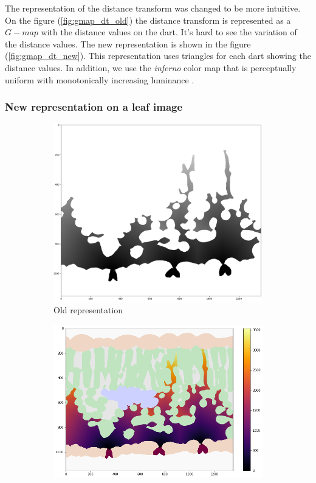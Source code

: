 The representation of the distance transform was changed to be more intuitive. On
the figure (\ref{fig:gmap_dt_old}) the distance transform is represented as a
$G-map$ with the distance values on the dart. It's hard to see the variation of the
distance values. The new representation is shown in the figure (\ref{fig:gmap_dt_new}).
This representation uses triangles for each dart showing the distance values. In
addition, we use the \textit{inferno} color map that is perceptually uniform with 
monotonically increasing luminance \cite{Moreland}.

\subsubsection{New representation on a leaf image}

\begin{figure}[h]
    \centering
    \begin{subfigure}{0.45\textwidth}
        \centering
        \includegraphics[width=\textwidth]{figures/leaf_dt_old.png}
        \caption{Old representation}
        \label{fig:leaf_dt_old}
    \end{subfigure}
    \hfill
    \begin{subfigure}{0.54\textwidth}
        \centering
        \includegraphics[width=\textwidth]{figures/leaf_dt_new.png}

\end{subfigure}
\end{figure}
